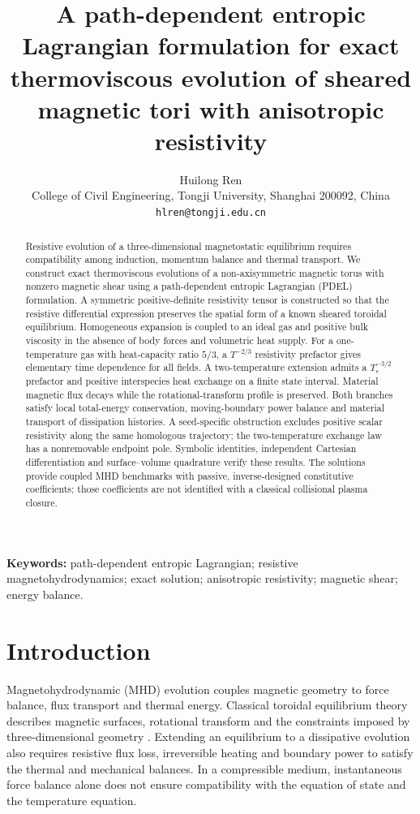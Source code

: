 \documentclass[11pt,a4paper]{article}
\title{\bfseries A path-dependent entropic Lagrangian formulation for exact thermoviscous evolution of sheared magnetic tori with anisotropic resistivity}
\author{Huilong Ren\\[0.3em]
\small College of Civil Engineering, Tongji University, Shanghai 200092, China\\
\small \texttt{hlren@tongji.edu.cn}}
\date{}
\theoremstyle{remark}\newtheorem{remark}{Remark}
\numberwithin{equation}{section}
\begin{document}
\maketitle
\begin{abstract}
Resistive evolution of a three-dimensional magnetostatic equilibrium requires compatibility among induction, momentum balance and thermal transport. We construct exact thermoviscous evolutions of a non-axisymmetric magnetic torus with nonzero magnetic shear using a path-dependent entropic Lagrangian (PDEL) formulation. A symmetric positive-definite resistivity tensor is constructed so that the resistive differential expression preserves the spatial form of a known sheared toroidal equilibrium. Homogeneous expansion is coupled to an ideal gas and positive bulk viscosity in the absence of body forces and volumetric heat supply. For a one-temperature gas with heat-capacity ratio $5/3$, a $T^{-2/3}$ resistivity prefactor gives elementary time dependence for all fields. A two-temperature extension admits a $T_e^{-3/2}$ prefactor and positive interspecies heat exchange on a finite state interval. Material magnetic flux decays while the rotational-transform profile is preserved. Both branches satisfy local total-energy conservation, moving-boundary power balance and material transport of dissipation histories. A seed-specific obstruction excludes positive scalar resistivity along the same homologous trajectory; the two-temperature exchange law has a nonremovable endpoint pole. Symbolic identities, independent Cartesian differentiation and surface--volume quadrature verify these results. The solutions provide coupled MHD benchmarks with passive, inverse-designed constitutive coefficients; those coefficients are not identified with a classical collisional plasma closure.
\end{abstract}
\noindent\textbf{Keywords:} path-dependent entropic Lagrangian; resistive magnetohydrodynamics; exact solution; anisotropic resistivity; magnetic shear; energy balance.
\section{Introduction}\label{sec:intro}
Magnetohydrodynamic (MHD) evolution couples magnetic geometry to force balance, flux transport and thermal energy. Classical toroidal equilibrium theory describes magnetic surfaces, rotational transform and the constraints imposed by three-dimensional geometry \citep{Kruskal1958,Grad1967,Helander2014}. Extending an equilibrium to a dissipative evolution also requires resistive flux loss, irreversible heating and boundary power to satisfy the thermal and mechanical balances. In a compressible medium, instantaneous force balance alone does not ensure compatibility with the equation of state and the temperature equation.
\end{document}
